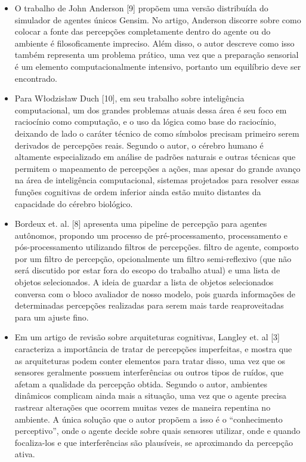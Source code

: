 \begin{itemize}
    \item O trabalho de John Anderson [9] propõem uma versão distribuída do simulador de agentes únicos Gensim. No artigo, Anderson discorre sobre como colocar a fonte das percepções completamente dentro do agente ou do ambiente é filosoficamente impreciso. Além disso, o autor descreve como isso também representa um problema prático, uma vez que a preparação sensorial é um elemento computacionalmente intensivo, portanto um equilíbrio deve ser encontrado.
    
    \item Para Włodzisław Duch [10], em seu trabalho sobre inteligência computacional, um dos grandes problemas atuais dessa área é seu foco em raciocínio como computação, e o uso da lógica como base do raciocínio, deixando de lado o caráter técnico de como símbolos precisam primeiro serem derivados de percepções reais. Segundo o autor, o cérebro humano é altamente especializado em análise de padrões naturais e outras técnicas que permitem o mapeamento de percepções a ações, mas apesar do grande avanço na área de inteligência computacional, sistemas projetados para resolver essas funções cognitivas de ordem inferior ainda estão muito distantes da capacidade do cérebro biológico.
    
    \item Bordeux et. al. [8] apresenta uma pipeline de percepção para agentes autônomos, propondo um processo de pré-processamento, processamento e pós-processamento utilizando filtros de percepções. filtro de agente, composto por um filtro de percepção, opcionalmente um filtro semi-reflexivo (que não será discutido por estar fora do escopo do trabalho atual) e uma lista de objetos selecionados. A ideia de guardar a lista de objetos selecionados conversa com o bloco avaliador de nosso modelo, pois guarda informações de determinadas percepções realizadas para serem mais tarde reaproveitadas para um ajuste fino.
    
    \item Em um artigo de revisão sobre arquiteturas cognitivas, Langley et. al [3] caracteriza a importância de tratar de percepções imperfeitas, e mostra que as arquiteturas podem conter elementos para tratar disso, uma vez que os sensores geralmente possuem interferências ou outros tipos de ruídos, que afetam a qualidade da percepção obtida. Segundo o autor, ambientes dinâmicos complicam ainda mais a situação, uma vez que o agente precisa rastrear alterações que ocorrem muitas vezes de maneira repentina no ambiente. A única solução que o autor propõem a isso é o “conhecimento perceptivo”, onde o agente decide sobre quais sensores utilizar, onde e quando focaliza-los e que interferências são plausíveis, se aproximando da percepção ativa.
    

\end{itemize}
